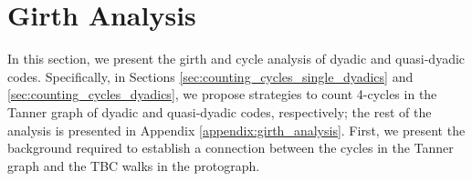 \documentclass[11pt]{article}
\theoremstyle{plain}
\theoremstyle{plain}
\theoremstyle{definition}
\numberwithin{theo}{section}
\begin{document}

\section{Girth Analysis}
\label{sec:girth_analysis}

In this section, we present the girth and cycle analysis of dyadic and quasi-dyadic codes. Specifically, in Sections \ref{sec:counting_cycles_single_dyadics} and \ref{sec:counting_cycles_dyadics}, we propose strategies to count 4-cycles in the Tanner graph of dyadic and quasi-dyadic codes, respectively; the rest of the analysis is presented in Appendix \ref{appendix:girth_analysis}. %
First, we present the background required to establish a connection between the cycles in the Tanner graph and the TBC walks in the protograph.
\end{document}
